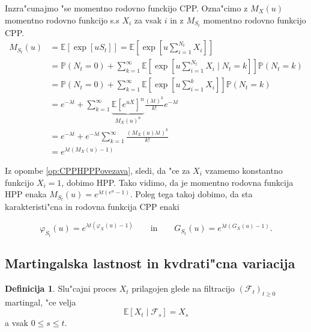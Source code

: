 \documentclass[12pt,a4paper]{amsart}
\theoremstyle{definition} %
\newtheorem{definicija}{Definicija}[section]
\theoremstyle{plain} %
\newcommand{\E}{\mathbb{E}}
\newcommand{\F}{\mathcal{F}}
\newcommand{\Prob}{\mathbb{P}}
\newcommand{\1}{\mathds{1}}
\begin{document}
    \noindent
    Inzra"cunajmo "se momentno rodovno funckijo CPP. Ozna"cimo z $M_X(u)$ momentno rodovno funkcijo 
    s.s $X_i$ za vsak $i$ in z $M_{S_t}$ momentno rodovno funkcijo CPP.
    \begin{align*}
        M_{S_t}(u) 
                &= \E\left[\exp\left[uS_t\right]\right] =
                    \E\left[\exp\left[u\sum_{i = 1}^{N_t}X_i\right]\right]\\
                &= \Prob\left(N_t = 0\right) + \sum_{k=1}^{\infty}
                    \E\left[\exp\left[u\sum_{i = 1}^{N_t}X_i\mid N_t=k\right]\right]\Prob\left(N_t = k\right)\\ 
                &= \Prob\left(N_t = 0\right) + \sum_{k=1}^{\infty}
                    \E\left[\exp\left[u\sum_{i = 1}^kX_i\right]\right]\Prob\left(N_t = k\right)\\
                &= e^{-\lambda t} + \sum_{k=1}^{\infty}
                    \underbrace{\E\left[e^{uX}\right]^n}_{M_X(u)^n}\frac{(\lambda t)^k}{k!}e^{-\lambda t}\\ 
                &= e^{-\lambda t} + e^{-\lambda t}\sum_{k=1}^\infty\frac{\left(M_X(u)\lambda t\right)^k}{k!}\\
                &= e^{\lambda t\left(M_X(u) - 1\right)}    
    \end{align*}

    Iz opombe \ref{op:CPPHPPPovezava}, sledi, da "ce za $X_i$ vzamemo konstantno funkcijo 
    $X_i = 1$, dobimo HPP. Tako vidimo, da je momentno rodovna funkcija HPP enaka 
    $M_{S_t}(u) = e^{\lambda t\left(e^u - 1\right)}$. Poleg tega takoj dobimo, da sta 
    karakteristi"cna in rodovna funkcija CPP enaki

    \begin{equation*}
        \varphi_{S_t}(u) = e^{\lambda t\left(\varphi_X(u) - 1\right)} \qquad \text{in} \qquad 
        G_{S_t}(u) = e^{\lambda t\left(G_X(u) - 1\right)}.
    \end{equation*} 

    \subsection{Martingalska lastnost in kvdrati"cna variacija}
        
        \begin{definicija}
            Slu"cajni proces $X_t$ prilagojen glede na filtracijo $(\F_t)_{t\geq0}$
            martingal, "ce velja 
            $$
                \E\left[X_t\mid\F_s\right] = X_s
            $$
            a vsak $0\leq s \leq t$.
            \label{def:martingal}
        \end{definicija}
\end{document}
